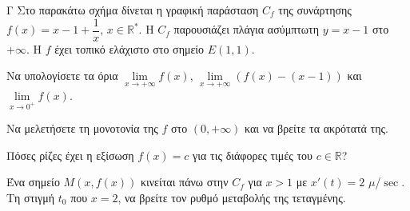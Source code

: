 \begin{thema}{Γ}
Στο παρακάτω σχήμα δίνεται η γραφική παράσταση $C_f$ της συνάρτησης $f(x)=x-1+\dfrac{1}{x}$, $x\in\mathbb{R}^*$. Η $C_f$ παρουσιάζει πλάγια ασύμπτωτη $y = x - 1$ στο $+\infty$. Η $f$ έχει τοπικό ελάχιστο στο σημείο $E(1, 1)$.

\begin{center}
\end{center}

\begin{erwthma}
  \item Να υπολογίσετε τα όρια $\displaystyle\lim\limits_{x \to +\infty} f(x)$, $\displaystyle\lim\limits_{x \to +\infty} (f(x) - (x-1))$ και $\displaystyle\lim\limits_{x \to 0^+} f(x)$.
  \item Να μελετήσετε τη μονοτονία της $f$ στο $(0, +\infty)$ και να βρείτε τα ακρότατά της.
  \item Πόσες ρίζες έχει η εξίσωση $f(x) = c$ για τις διάφορες τιμές του $c \in \mathbb{R}$?
  \item Ένα σημείο $M(x, f(x))$ κινείται πάνω στην $C_f$ για $x > 1$ με $x'(t) = 2$ $\mu$/$\sec$. Τη στιγμή $t_0$ που $x = 2$, να βρείτε τον ρυθμό μεταβολής της τεταγμένης.
\end{erwthma}
\end{thema}


